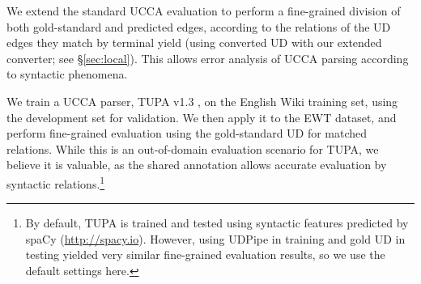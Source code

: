 \documentclass[11pt,a4paper]{article}
\begin{document}
We extend the standard UCCA evaluation to perform a fine-grained division
of both gold-standard and predicted edges,
according to the relations of the UD edges they match by terminal yield
(using converted UD with our extended converter; see \S\ref{sec:local}).
This allows error analysis of UCCA parsing according to syntactic phenomena.

We train a UCCA parser,
TUPA v1.3 \cite{hershcovich2017a,hershcovich2018multitask},
on the English Wiki training set, using the development set for validation.
We then apply it to the EWT dataset,
and perform fine-grained evaluation
using the gold-standard UD for matched relations.
While this is an out-of-domain evaluation scenario for TUPA,
we believe it is valuable,
as the shared annotation allows accurate evaluation by syntactic
relations.\footnote{By default, TUPA is trained and tested using syntactic features
predicted by spaCy (\url{http://spacy.io}).
However, using UDPipe in training and gold UD in testing yielded very similar
fine-grained evaluation results, so we use the default settings here.}


%


%

%
\end{document}
